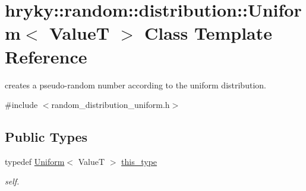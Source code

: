 \hypertarget{classhryky_1_1random_1_1distribution_1_1_uniform}{\section{hryky\-:\-:random\-:\-:distribution\-:\-:Uniform$<$ Value\-T $>$ Class Template Reference}
\label{classhryky_1_1random_1_1distribution_1_1_uniform}
}


creates a pseudo-\/random number according to the uniform distribution.  




{\ttfamily \#include $<$random\-\_\-distribution\-\_\-uniform.\-h$>$}

\subsection*{Public Types}
\begin{DoxyCompactItemize}
\item 
\hypertarget{classhryky_1_1random_1_1distribution_1_1_uniform_ae66a5ff0c431e0cef1cd4b8e96aa94d5}{typedef \hyperlink{classhryky_1_1random_1_1distribution_1_1_uniform}{Uniform}$<$ Value\-T $>$ \hyperlink{classhryky_1_1random_1_1distribution_1_1_uniform_ae66a5ff0c431e0cef1cd4b8e96aa94d5}{this\-\_\-type}}\label{classhryky_1_1random_1_1distribution_1_1_uniform_ae66a5ff0c431e0cef1cd4b8e96aa94d5}

\begin{DoxyCompactList}\small\item\em self. \end{DoxyCompactList}\end{DoxyCompactItemize}
